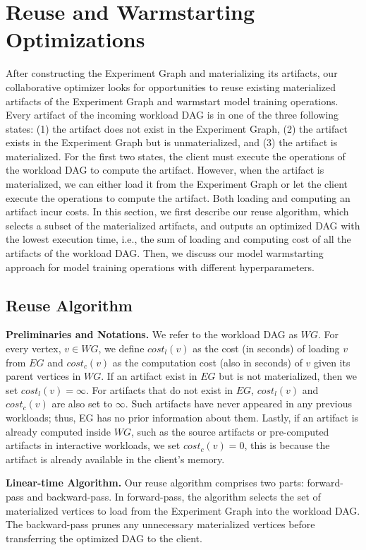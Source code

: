 \section{Reuse and Warmstarting Optimizations}\label{sec-reuse-and-warmstarting}
After constructing the Experiment Graph and materializing its artifacts, our collaborative optimizer looks for opportunities to reuse existing materialized artifacts of the Experiment Graph and warmstart model training operations.
Every artifact of the incoming workload DAG is in one of the three following states: (1) the artifact does not exist in the Experiment Graph, (2) the artifact exists in the Experiment Graph but is unmaterialized, and (3) the artifact is materialized.
For the first two states, the client must execute the operations of the workload DAG to compute the artifact.
However, when the artifact is materialized, we can either load it from the Experiment Graph or let the client execute the operations to compute the artifact.
Both loading and computing an artifact incur costs.
In this section, we first describe our reuse algorithm, which selects a subset of the materialized artifacts, and outputs an optimized DAG with the lowest execution time, i.e., the sum of loading and computing cost of all the artifacts of the workload DAG.
Then, we discuss our model warmstarting approach for model training operations with different hyperparameters.

\subsection{Reuse Algorithm} 
\textbf{Preliminaries and Notations.} 
We refer to the workload DAG as $WG$.
For every vertex, $v \in WG$, we define $cost_l(v)$ as the cost (in seconds) of loading $v$ from $EG$ and $cost_c(v)$ as the computation cost (also in seconds) of $v$ given its parent vertices in $WG$.
If an artifact exist in $EG$ but is not materialized, then we set $cost_l(v)=\infty$.
For artifacts that do not exist in $EG$, $cost_l(v)$ and $cost_c(v)$ are also set to $\infty$.
Such artifacts have never appeared in any previous workloads; thus, EG has no prior information about them.
Lastly, if an artifact is already computed inside $WG$, such as the source artifacts or pre-computed artifacts in interactive workloads, we set $cost_c(v)=0$, this is because the artifact is already available in the client's memory.

\textbf{Linear-time Algorithm.}
Our reuse algorithm comprises two parts: forward-pass and backward-pass.
In forward-pass, the algorithm selects the set of materialized vertices to load from the Experiment Graph into the workload DAG.
The backward-pass prunes any unnecessary materialized vertices before transferring the optimized DAG to the client.

